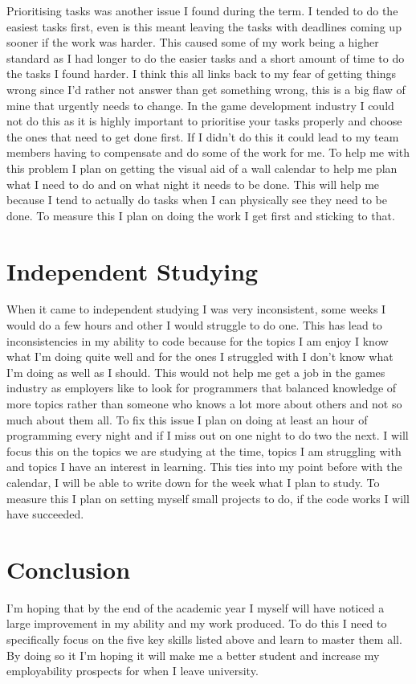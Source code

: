 \documentclass{scrartcl}
\begin{document}
Prioritising tasks was another issue I found during the term. I tended to do the easiest tasks first, even is this meant leaving the tasks with deadlines coming up sooner if the work was harder. This caused some of my work being a higher standard as I had longer to do the easier tasks and a short amount of time to do the tasks I found harder. I think this all links back to my fear of getting things wrong since I'd rather not answer than get something wrong, this is a big flaw of mine that urgently needs to change. In the game development industry I could not do this as it is highly important to prioritise your tasks properly and choose the ones that need to get done first. If I didn't do this it could lead to my team members having to compensate and do some of the work for me. To help me with this problem I plan on getting the visual aid of a wall calendar to help me plan what I need to do and on what night it needs to be done. This will help me because I tend to actually do tasks when I can physically see they need to be done. To measure this I plan on doing the work I get first and sticking to that.

\section{Independent Studying}

When it came to independent studying I was very inconsistent, some weeks I would do a few hours and other I would struggle to do one. This has lead to inconsistencies in my ability to code because for the topics I am enjoy I know what I'm doing quite well and for the ones I struggled with I don't  know what I'm doing as well as I should. This would not help me get a job in the games industry as employers like to look for programmers that balanced knowledge of more topics rather than someone who knows a lot more about others and not so much about them all. To fix this issue I plan on doing at least an hour of programming every night and if I miss out on one night to do two the next. I will focus this on the topics we are studying at the time, topics I am struggling with and topics I have an interest in learning. This ties into my point before with the calendar, I will be able to write down for the week what I plan to study. To measure this I plan on setting myself small projects to do, if the code works I will have succeeded.

\section*{Conclusion}

I'm hoping that by the end of the academic year I myself will have noticed a large improvement in my ability and my work produced. To do this I need to specifically focus on the five key skills listed above and learn to master them all.  By doing so it I'm hoping it will make me a better student and increase my employability prospects for when I leave university. 



\end{document}
